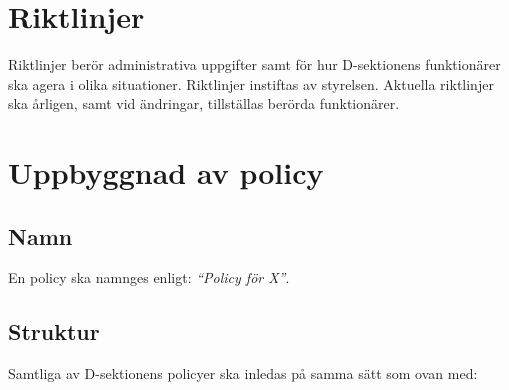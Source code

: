 \documentclass[]{dsekprotokoll}
\begin{document}
\section{Riktlinjer}
Riktlinjer berör administrativa uppgifter samt för hur D-sektionens funktionärer ska agera i olika situationer. Riktlinjer instiftas av styrelsen. Aktuella riktlinjer ska årligen, samt vid ändringar, tillställas berörda funktionärer.

\section{Uppbyggnad av policy}

\subsection{Namn}

En policy ska namnges enligt: \textit{``Policy för X''}.

\subsection{Struktur}

Samtliga av D-sektionens policyer ska inledas på samma sätt som ovan med:
\end{document}
